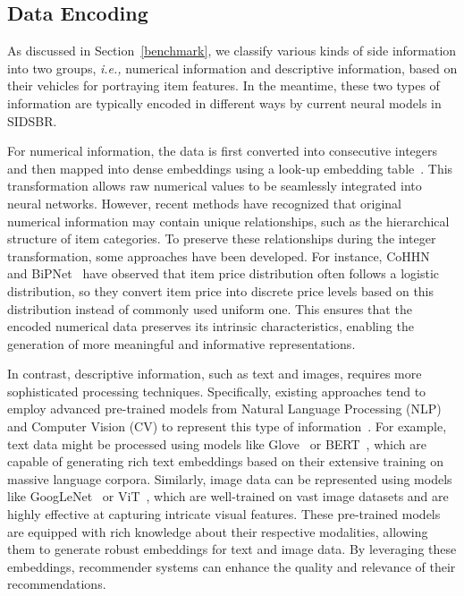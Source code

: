 \documentclass[lettersize,journal]{IEEEtran}
\newcommand{\ie}{\emph{i.e.,}\xspace}
\newcommand{\baby}{{SIDSBR}\xspace}
\begin{document}
\subsection{Data Encoding}
As discussed in Section~\ref{benchmark}, we classify various kinds of side information into two groups, \ie numerical information and descriptive information, based on their vehicles for portraying item features. In the meantime, these two types of information are typically encoded in different ways by current neural models in \baby. 

For numerical information, the data is first converted into consecutive integers and then mapped into dense embeddings using a look-up embedding table~\cite{CoHHN,song@CIKM2021,Liu@RecSys2023}. This transformation allows raw numerical values to be seamlessly integrated into neural networks. However, recent methods have recognized that original numerical information may contain unique relationships, such as the hierarchical structure of item categories. To preserve these relationships during the integer transformation, some approaches have been developed. For instance, CoHHN~\cite{CoHHN} and BiPNet~\cite{BiPNet} have observed that item price distribution often follows a logistic distribution, so they convert item price into discrete price levels based on this distribution instead of commonly used uniform one. This ensures that the encoded numerical data preserves its intrinsic characteristics, enabling the generation of more meaningful and informative representations.

In contrast, descriptive information, such as text and images, requires more sophisticated processing techniques. Specifically, existing approaches tend to employ advanced pre-trained models from Natural Language Processing (NLP) and Computer Vision (CV) to represent this type of information~\cite{Wei@MM2019,Sun@CIKM2020,Wang@TOIS2024}. For example, text data might be processed using models like Glove~\cite{Glove} or BERT~\cite{BERT}, which are capable of generating rich text embeddings based on their extensive training on massive language corpora. Similarly, image data can be represented using models like GoogLeNet~\cite{googlenet} or ViT~\cite{ViT}, which are well-trained on vast image datasets and are highly effective at capturing intricate visual features. These pre-trained models are equipped with rich knowledge about their respective modalities, allowing them to generate robust embeddings for text and image data. By leveraging these embeddings, recommender systems can enhance the quality and relevance of their recommendations.
\end{document}
